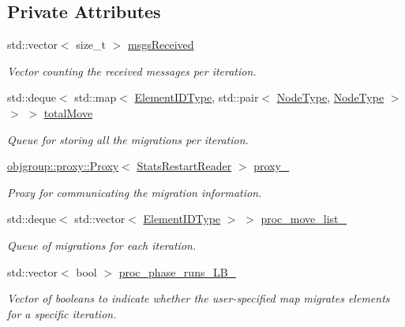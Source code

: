 \subsection*{Private Attributes}
\begin{DoxyCompactItemize}
\item 
std\+::vector$<$ size\+\_\+t $>$ \hyperlink{structvt_1_1vrt_1_1collection_1_1balance_1_1_stats_restart_reader_aac24c7a1c06519aaa6b3af18276415b4}{msgs\+Received}
\begin{DoxyCompactList}\small\item\em Vector counting the received messages per iteration. \end{DoxyCompactList}\item 
std\+::deque$<$ std\+::map$<$ \hyperlink{namespacevt_1_1vrt_1_1collection_1_1balance_a592736f733df4f90856df90a1fd08905}{Element\+I\+D\+Type}, std\+::pair$<$ \hyperlink{namespacevt_a866da9d0efc19c0a1ce79e9e492f47e2}{Node\+Type}, \hyperlink{namespacevt_a866da9d0efc19c0a1ce79e9e492f47e2}{Node\+Type} $>$ $>$ $>$ \hyperlink{structvt_1_1vrt_1_1collection_1_1balance_1_1_stats_restart_reader_aabfc46df6681168e7f982c8b7ea5c778}{total\+Move}
\begin{DoxyCompactList}\small\item\em Queue for storing all the migrations per iteration. \end{DoxyCompactList}\item 
\hyperlink{structvt_1_1objgroup_1_1proxy_1_1_proxy}{objgroup\+::proxy\+::\+Proxy}$<$ \hyperlink{structvt_1_1vrt_1_1collection_1_1balance_1_1_stats_restart_reader}{Stats\+Restart\+Reader} $>$ \hyperlink{structvt_1_1vrt_1_1collection_1_1balance_1_1_stats_restart_reader_ad4039b19a32b7269be28d2a66322c7e3}{proxy\+\_\+}
\begin{DoxyCompactList}\small\item\em Proxy for communicating the migration information. \end{DoxyCompactList}\item 
std\+::deque$<$ std\+::vector$<$ \hyperlink{namespacevt_1_1vrt_1_1collection_1_1balance_a592736f733df4f90856df90a1fd08905}{Element\+I\+D\+Type} $>$ $>$ \hyperlink{structvt_1_1vrt_1_1collection_1_1balance_1_1_stats_restart_reader_ac2cb2c9b607fcf696456cb758d3cfeae}{proc\+\_\+move\+\_\+list\+\_\+}
\begin{DoxyCompactList}\small\item\em Queue of migrations for each iteration. \end{DoxyCompactList}\item 
std\+::vector$<$ bool $>$ \hyperlink{structvt_1_1vrt_1_1collection_1_1balance_1_1_stats_restart_reader_a52d652c1465e46f12d5915bc98dc618b}{proc\+\_\+phase\+\_\+runs\+\_\+\+L\+B\+\_\+}
\begin{DoxyCompactList}\small\item\em Vector of booleans to indicate whether the user-\/specified map migrates elements for a specific iteration. \end{DoxyCompactList}\end{DoxyCompactItemize}
